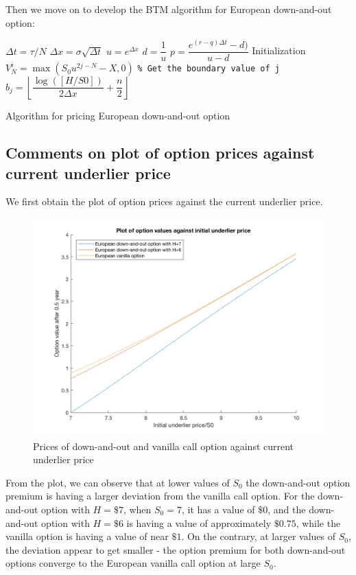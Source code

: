 Then we move on to develop the BTM algorithm for European down-and-out option:

\begin{algorithm}[H]
 $\Delta t = \tau / N$\;
 $\Delta x = \sigma \sqrt{\Delta t}$\;
 $u = e^{\Delta x}$\;
 $d = \dfrac{1}{u}$\;
 $p = \dfrac{e^{(r-q)\Delta t} - d)}{u - d}$\;
 Initialization\;
  {
  $V_{N}^{i} = \max(S_0u^{2j - N} - X, 0)$\;
 }
  {
  \texttt{\% Get the boundary value of j}\;
  $b_j =\left \lfloor \dfrac{\log([H/S0])}{2 \Delta x}+ \dfrac{n}{2}\right\rfloor$\;
 	 {
 	}
 }
\caption{Algorithm for pricing European down-and-out option}
\end{algorithm}
\subsection{Comments on plot of option prices against current underlier price}
We first obtain the plot of option prices against the current underlier price.
\begin{figure}
	\centering
	\includegraphics[scale=0.3]{A1_1_plot.png}
	\caption{Prices of down-and-out and vanilla call option against current underlier price}
\end{figure}

From the plot, we can observe that at lower values of $S_0$ the down-and-out option premium is having a larger deviation from the vanilla call option. For the down-and-out option with $H = \$7$, when $S_0=7$, it has a value of $\$0$, and the down-and-out option with $H = \$6$ is having a value of approximately $\$0.75$, while the vanilla option is having a value of near $\$1$. On the contrary, at larger values of $S_0$, the deviation appear to get smaller - the option premium for both down-and-out options converge to the European vanilla call option at large $S_0$. 

